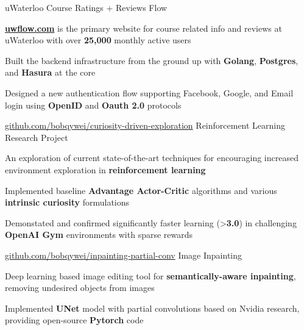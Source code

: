 
\begin{cventries}
  \cventry
    {uWaterloo Course Ratings + Reviews} %
    {Flow} %
    {} %
    {} %
    {
      \begin{cvitems} %
        \item {\href{https://uwflow.com}{\textbf{uwflow.com}} is the primary website for course related info and reviews at uWaterloo with over \textbf{25,000} monthly active users}
        \item {Built the backend infrastructure from the ground up with \textbf{Golang}, \textbf{Postgres}, and \textbf{Hasura} at the core}
        \item {Designed a new authentication flow supporting Facebook, Google, and Email login using \textbf{OpenID} and \textbf{Oauth 2.0} protocols}
      \end{cvitems}
    }

  \cventry
    {\href{https://github.com/bobqywei/curiosity-driven-exploration}{github.com/bobqywei/curiosity-driven-exploration}} %
    {Reinforcement Learning Research Project} %
    {} %
    {} %
    {
      \begin{cvitems} %
      	\item {An exploration of current state-of-the-art techniques for encouraging increased environment exploration in \textbf{reinforcement learning}}
      	\item {Implemented baseline \textbf{Advantage Actor-Critic} algorithms and various \textbf{intrinsic curiosity} formulations}
      	\item {Demonstated and confirmed significantly faster learning (>\textbf{3.0\times}) in challenging \textbf{OpenAI Gym} environments with sparse rewards}
      \end{cvitems}
    }

  \cventry
    {\href{https://github.com/bobqywei/inpainting-partial-conv}{github.com/bobqywei/inpainting-partial-conv}} %
    {Image Inpainting} %
    {} %
    {} %
    {
      \begin{cvitems} %
        \item {Deep learning based image editing tool for \textbf{semantically-aware inpainting}, removing undesired objects from images}
        \item {Implemented \textbf{UNet} model with partial convolutions based on Nvidia research, providing open-source \textbf{Pytorch} code}
      \end{cvitems}
    }
\end{cventries}